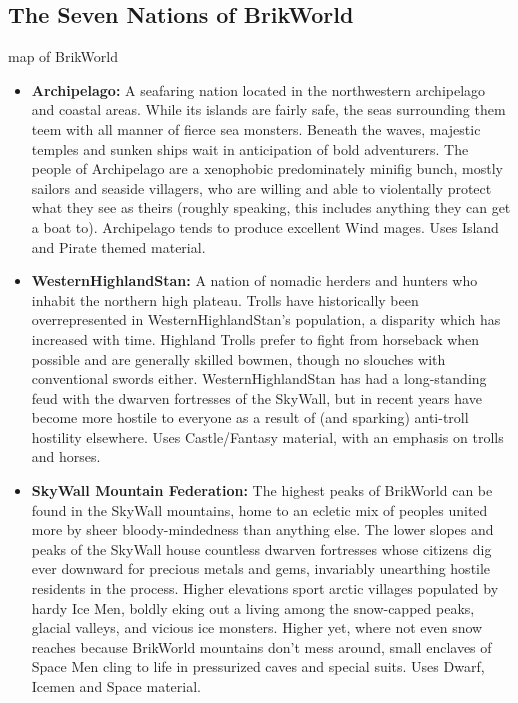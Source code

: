 \documentclass[12pt,a4paper,twocolumn]{article}
\begin{document}
\subsection{The Seven Nations of BrikWorld}

map of BrikWorld

\begin{itemize}
\item {\bf Archipelago:} A seafaring nation located in the northwestern archipelago and coastal areas.  While its islands are fairly safe, the seas surrounding them teem with all manner of fierce sea monsters.  Beneath the waves, majestic temples and sunken ships wait in anticipation of bold adventurers.  The people of Archipelago are a xenophobic predominately minifig bunch, mostly sailors and seaside villagers, who are willing and able to violentally protect what they see as theirs (roughly speaking, this includes anything they can get a boat to).  Archipelago tends to produce excellent Wind mages.  Uses Island and Pirate themed material.

\item {\bf WesternHighlandStan:} A nation of nomadic herders and hunters who inhabit the northern high plateau.  Trolls have historically been overrepresented in WesternHighlandStan's population, a disparity which has increased with time.  Highland Trolls prefer to fight from horseback when possible and are generally skilled bowmen, though no slouches with conventional swords either.  WesternHighlandStan has had a long-standing feud with the dwarven fortresses of the SkyWall, but in recent years have become more hostile to everyone as a result of (and sparking) anti-troll hostility elsewhere.  Uses Castle/Fantasy material, with an emphasis on trolls and horses.

\item {\bf SkyWall Mountain Federation:} The highest peaks of BrikWorld can be found in the SkyWall mountains, home to an ecletic mix of peoples united more by sheer bloody-mindedness than anything else.  The lower slopes and peaks of the SkyWall house countless dwarven fortresses whose citizens dig ever downward for precious metals and gems, invariably unearthing hostile residents in the process.  Higher elevations sport arctic villages populated by hardy Ice Men, boldly eking out a living among the snow-capped peaks, glacial valleys, and vicious ice monsters.  Higher yet, where not even snow reaches because BrikWorld mountains don't mess around, small enclaves of Space Men cling to life in pressurized caves and special suits.  Uses Dwarf, Icemen and Space material.


\end{itemize}
\end{document}
